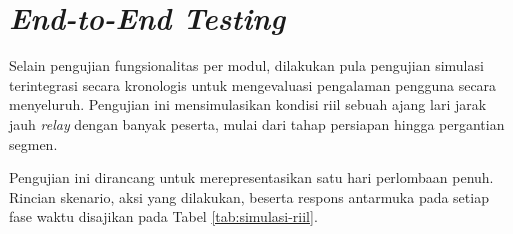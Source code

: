\section{\textit{End-to-End Testing}}
Selain pengujian fungsionalitas per modul, dilakukan pula pengujian simulasi terintegrasi secara kronologis untuk mengevaluasi pengalaman pengguna secara menyeluruh. Pengujian ini mensimulasikan kondisi riil sebuah ajang lari jarak jauh \textit{relay} dengan banyak peserta, mulai dari tahap persiapan hingga pergantian segmen.

Pengujian ini dirancang untuk merepresentasikan satu hari perlombaan penuh. Rincian skenario, aksi yang dilakukan, beserta respons antarmuka pada setiap fase waktu disajikan pada Tabel \ref{tab:simulasi-riil}.




    
    
